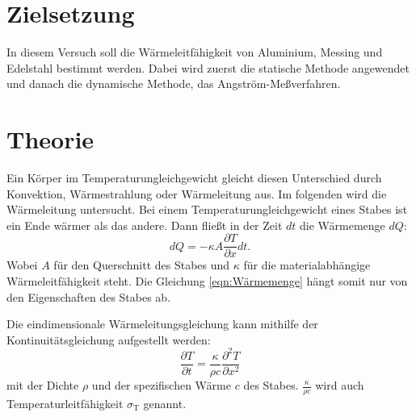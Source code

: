\section{Zielsetzung}
\label{Zielsetzung}
In diesem Versuch soll die Wärmeleitfähigkeit von Aluminium, Messing und Edelstahl bestimmt werden.
Dabei wird zuerst die statische Methode angewendet und danach die dynamische Methode, das Angström-Meßverfahren.

\section{Theorie}
\label{Theorie}
Ein Körper im Temperaturungleichgewicht gleicht diesen Unterschied durch Konvektion, Wärmestrahlung oder Wärmeleitung aus.
Im folgenden wird die Wärmeleitung untersucht.
Bei einem Temperaturungleichgewicht eines Stabes ist ein Ende wärmer als das andere.
Dann fließt in der Zeit $dt$ die Wärmemenge $dQ$:
\begin{equation}\label{eqn:Wärmemenge}
    dQ = -\kappa A \frac{\partial T}{\partial x}dt .
\end{equation}
Wobei $A$ für den Querschnitt des Stabes und $\kappa$ für die materialabhängige Wärmeleitfähigkeit steht.
Die Gleichung \eqref{eqn:Wärmemenge} hängt somit nur von den Eigenschaften des Stabes ab.

Die eindimensionale Wärmeleitungsgleichung kann mithilfe der Kontinuitätsgleichung aufgestellt werden:
\begin{equation*}
    \frac{\partial T}{\partial t} = \frac{\kappa}{\rho c} \frac{\partial^2 T}{\partial x^2}
\end{equation*}
mit der Dichte $\rho$ und der spezifischen Wärme $c$ des Stabes.
$\frac{\kappa}{\rho c}$ wird auch Temperaturleitfähigkeit $\sigma_\text{T}$ genannt.

